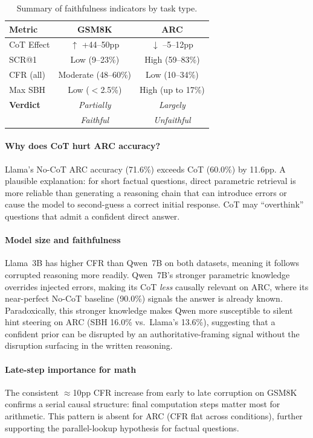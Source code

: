 \documentclass[11pt,twocolumn]{article}
\begin{document}
\begin{table}[h!]
\centering
\small
\begin{tabular}{lcc}
\toprule
\textbf{Metric} & \textbf{GSM8K} & \textbf{ARC} \\
\midrule
CoT Effect   & $\uparrow$ +44--50pp   & $\downarrow$ --5--12pp \\
SCR@1        & Low (9--23\%)          & High (59--83\%) \\
CFR (all)    & Moderate (48--60\%)    & Low (10--34\%) \\
Max SBH      & Low ($<$2.5\%)         & High (up to 17\%) \\
\midrule
\textbf{Verdict} & \textit{Partially} & \textit{Largely} \\
                 & \textit{Faithful}  & \textit{Unfaithful} \\
\bottomrule
\end{tabular}
\caption{Summary of faithfulness indicators by task type.}
\label{tab:summary}
\end{table}

\paragraph{Why does CoT hurt ARC accuracy?}
Llama's No-CoT ARC accuracy (71.6\%) exceeds CoT (60.0\%) by 11.6pp. A
plausible explanation: for short factual questions, direct parametric retrieval
is more reliable than generating a reasoning chain that can introduce errors
or cause the model to second-guess a correct initial response. CoT may
``overthink'' questions that admit a confident direct answer.

\paragraph{Model size and faithfulness}
Llama~3B has higher CFR than Qwen~7B on both datasets, meaning it follows
corrupted reasoning more readily. Qwen~7B's stronger parametric knowledge
overrides injected errors, making its CoT \emph{less} causally relevant on
ARC, where its near-perfect No-CoT baseline (90.0\%) signals the answer is
already known. Paradoxically, this stronger knowledge makes Qwen more
susceptible to silent hint steering on ARC (SBH 16.0\% vs.\ Llama's 13.6\%),
suggesting that a confident prior can be disrupted by an authoritative-framing
signal without the disruption surfacing in the written reasoning.

\paragraph{Late-step importance for math}
The consistent $\approx$10pp CFR increase from early to late corruption on
GSM8K confirms a serial causal structure: final computation steps matter most
for arithmetic. This pattern is absent for ARC (CFR flat across conditions),
further supporting the parallel-lookup hypothesis for factual questions.
\end{document}
